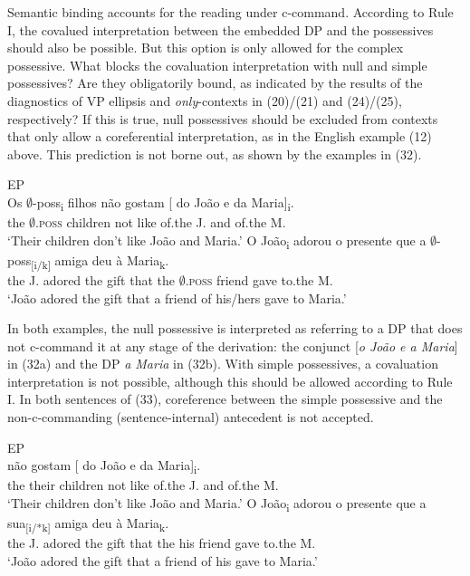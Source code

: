 \documentclass[output=paper]{langsci/langscibook}
\begin{document}
Semantic binding accounts for the reading under c-command. According to Rule I, the covalued interpretation between the embedded DP and the possessives should also be possible. But this option is only allowed for the complex possessive. What blocks the covaluation interpretation with null and simple possessives? Are they obligatorily bound, as indicated by the results of the diagnostics of VP ellipsis and \textit{only}{}-contexts in (20)/(21) and (24)/(25), respectively? If this is true, null possessives should be excluded from contexts that only allow a coreferential interpretation, as in the English example (12) above. This prediction is not borne out, as shown by the examples in (32).

\ea%
         EP\label{ex:wein:32}\\
    \ea  
    \gll Os $\emptyset$-poss\textsubscript{i} filhos não gostam [ do João e da Maria]\textsubscript{i}.\\
         the $\emptyset$\textsc{.poss} children not like {} of.the J. and of.the M.\\
    \glt ‘Their children don’t like João and Maria.’
    \ex 
    \gll O João\textsubscript{i} adorou o presente que a $\emptyset$-poss\textsubscript{[i/k]} amiga deu à Maria\textsubscript{k}.\\
         the J. adored the gift that the $\emptyset$\textsc{.poss} friend gave to.the M.\\
    \glt ‘João adored the gift that a friend of his\slash hers gave to Maria.’
    \z
\z    

In both examples, the null possessive is interpreted as referring to a DP that does not c-command it at any stage of the derivation: the conjunct [\textit{o João e a Maria}] in (32a) and the DP \textit{a Maria} in (32b). With simple possessives, a covaluation interpretation is not possible, although this should be allowed according to Rule I. In both sentences of (33), coreference between the simple possessive and the non-c-commanding (sentence-internal) antecedent is not accepted.

\ea%
         EP\label{ex:wein:33}\\
    \ea  
    \gll {} não gostam [ do João e da Maria]\textsubscript{i}.\\
         {} the their children not like {} of.the J. and of.the M.\\
    \glt ‘Their children don’t like João and Maria.’
    \ex  
    \gll O João\textsubscript{i} adorou o presente que a sua\textsubscript{[i/*k]} amiga deu à Maria\textsubscript{k}.\\
         the J. adored the gift that the his friend gave to.the M.\\
    \glt ‘João adored the gift that a friend of his gave to Maria.’
    \z
\z
\end{document}
